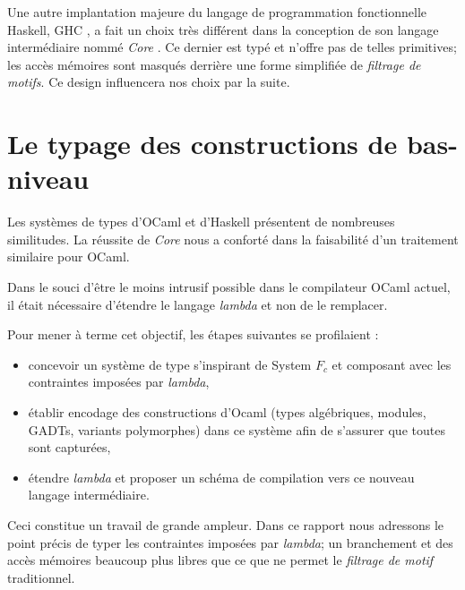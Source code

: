 Une autre implantation majeure du langage de programmation fonctionnelle
Haskell, GHC \cite{Marlow98thenew}, a fait un choix très différent dans la
conception de son langage intermédiaire nommé \emph{Core}
\cite{Sulzmann07systemf}.  Ce dernier est typé et n'offre pas de telles
primitives; les accès mémoires sont masqués derrière une forme simplifiée de
\emph{filtrage de motifs}. Ce design
influencera nos choix par la suite.

\section{Le typage des constructions de bas-niveau}

Les systèmes de types d'OCaml et d'Haskell présentent de nombreuses
similitudes. La réussite de \emph{Core} nous a conforté dans la faisabilité
d'un traitement similaire pour OCaml.

Dans le souci d'être le moins intrusif possible dans le compilateur
OCaml actuel, il était nécessaire d'étendre le langage \emph{lambda} et non de
le remplacer.

Pour mener à terme cet objectif, les étapes suivantes se profilaient :
\begin{itemize}
  \item concevoir un système de type s'inspirant de System $F_c$ et composant
    avec les contraintes imposées par \emph{lambda},
  \item établir encodage des constructions d'Ocaml (types algébriques, modules,
    GADTs, variants polymorphes) dans ce système afin de s'assurer que toutes
    sont capturées,
  \item étendre \emph{lambda} et proposer un schéma de compilation vers ce
    nouveau langage intermédiaire.
\end{itemize}

Ceci constitue un travail de grande ampleur. Dans ce rapport nous adressons le
point précis de typer les contraintes imposées par \emph{lambda}; un
branchement et des accès mémoires beaucoup plus libres que ce que ne permet le
\emph{filtrage de motif} traditionnel.

